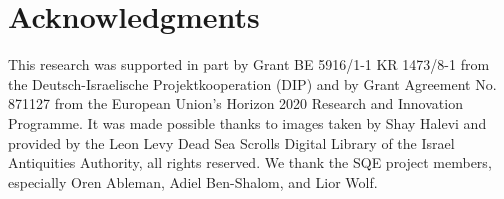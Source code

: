 \section*{Acknowledgments} This research was supported in part by Grant BE
5916/1-1 KR 1473/8-1 from the Deutsch-Israelische Projektkooperation (DIP) and
by Grant Agreement No. 871127 from the European Union’s Horizon 2020 Research
and Innovation Programme.  It was made possible thanks to images taken by Shay
Halevi and provided by the Leon Levy Dead Sea Scrolls Digital Library of the
Israel Antiquities Authority, all rights reserved.  We thank the SQE project
members, especially Oren Ableman, Adiel Ben-Shalom, and Lior Wolf.
